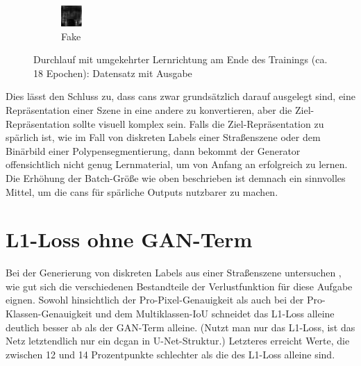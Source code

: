\begin{figure}
\begin{subfigure}{.19\textwidth}
		\includegraphics[width=.9\linewidth,interpolate=false]{img/results/btoa_fake}
		\caption{Fake}
	\end{subfigure}
	\caption{Durchlauf mit umgekehrter Lernrichtung am Ende des Trainings (ca. 18 Epochen): Datensatz mit Ausgabe}
	\label{fig:outputsbtoa}
\end{figure}

Dies lässt den Schluss zu, dass \glspl{can} zwar grundsätzlich darauf ausgelegt sind, eine Repräsentation einer Szene in eine andere zu konvertieren, aber die Ziel-Repräsentation sollte visuell komplex sein.
Falls die Ziel-Repräsentation zu spärlich ist, wie im Fall von diskreten Labels einer Straßenszene oder dem Binärbild einer Polypensegmentierung, dann bekommt der Generator offensichtlich nicht genug Lernmaterial, um von Anfang an erfolgreich zu lernen.
Die Erhöhung der Batch-Größe wie oben beschrieben ist demnach ein sinnvolles Mittel, um die \glspl{can} für spärliche Outputs nutzbarer zu machen.



\section{L1-Loss ohne GAN-Term}

Bei der Generierung von diskreten Labels aus einer Straßenszene untersuchen \citeauthor{Isola.2017}, wie gut sich die verschiedenen Bestandteile der Verlustfunktion für diese Aufgabe eignen.
Sowohl hinsichtlich der Pro-Pixel-Genauigkeit als auch bei der Pro-Klassen-Genauigkeit und dem Multiklassen-IoU schneidet das L1-Loss alleine deutlich besser ab als der GAN-Term alleine.
(Nutzt man nur das L1-Loss, ist das Netz letztendlich nur ein \gls{dcgan} in U-Net-Struktur.)
Letzteres erreicht Werte, die zwischen 12 und 14 Prozentpunkte schlechter als die des L1-Loss alleine sind.

